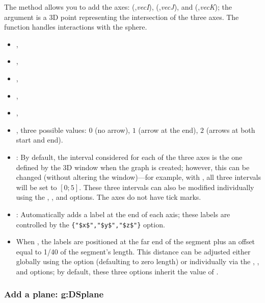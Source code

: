 The  method allows you to add the axes: (,\emph{vecI}), (,\emph{vecJ}), and (,\emph{vecK}); the  argument is a 3D point representing the intersection of the three axes. The function handles interactions with the sphere. \writeoptions
\begin{itemize}
    \item {},
    \item {},
    \item {},
    \item {},
    \item {},
    \item {}, three possible values: $0$ (no arrow), $1$ (arrow at the end), $2$ (arrows at both start and end). 

    \item {}: By default, the interval considered for each of the three axes is the one defined by the 3D window when the graph is created; however, this can be changed (without altering the window)—for example, with , all three intervals will be set to $[0;5]$. 
    These three intervals can also be modified individually using the , , and  options. The axes do not have tick marks. 

    \item {}: Automatically adds a label at the end of each axis; these labels are controlled by the \verb|{"$x$","$y$","$z$"}| option. 

    \item When , the labels are positioned at the far end of the segment plus an offset equal to 1/40 of the segment's length. This distance can be adjusted either globally using the  option (defaulting to zero length) or individually via the , , and  options; by default, these three options inherit the value of .
\end{itemize}

\subsubsection{Add a plane: g:DSplane}

